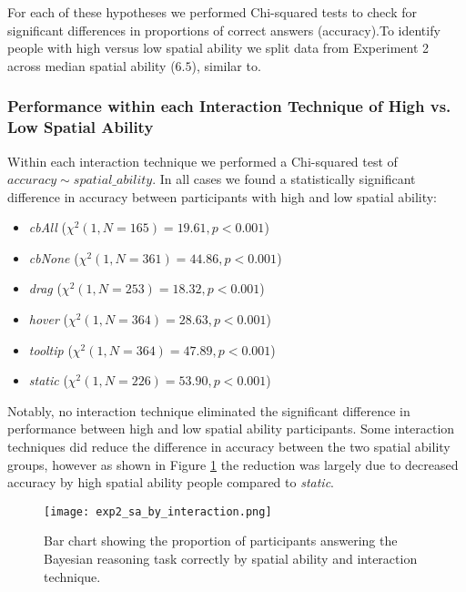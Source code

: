For each of these hypotheses we performed Chi-squared tests to check for significant differences in proportions of correct answers (accuracy).To identify people with high versus low spatial ability we split data from Experiment 2 across median spatial ability ($6.5$), similar to\cite{ottley2016Bayesian}. 

\subsubsection*{\textbf{Performance within each Interaction Technique of High vs. Low Spatial Ability}}
Within each interaction technique we performed a Chi-squared test of $accuracy \sim spatial\_ability$. In all cases we found a statistically significant difference in accuracy between participants with high and low spatial ability: 
\begin{itemize}
\item \textit{cbAll} ($\chi^2(1, N = 165) = 19.61, p < 0.001$)
\item \textit{cbNone} ($\chi^2(1, N = 361) = 44.86, p < 0.001$)
\item \textit{drag} ($\chi^2(1, N = 253) = 18.32, p < 0.001$)
\item \textit{hover} ($\chi^2(1, N = 364) = 28.63, p < 0.001$)
\item \textit{tooltip} ($\chi^2(1, N = 364) = 47.89, p < 0.001$)
\item \textit{static} ($\chi^2(1, N = 226) = 53.90, p < 0.001$)
\end{itemize} 

Notably, no interaction technique eliminated the significant difference in performance between high and low spatial ability participants. Some interaction techniques did reduce the difference in accuracy between the two spatial ability groups, however as shown in Figure \ref{fig:exp2_sa_by_interaction} the reduction was largely due to decreased accuracy by high spatial ability people compared to \textit{static}. 

\begin{figure}[h!]
 \texttt{[image: exp2\_sa\_by\_interaction.png]}
 \caption{Bar chart showing the proportion of participants answering the Bayesian reasoning task correctly by spatial ability and interaction technique. }
 \label{fig:exp2_sa_by_interaction}
\end{figure}

